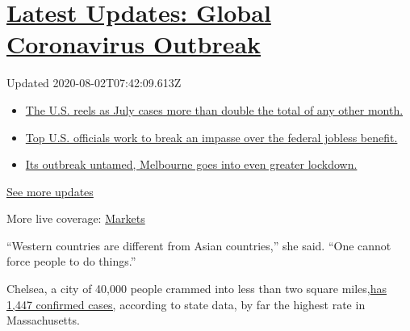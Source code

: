 \hypertarget{latest-updates-global-coronavirus-outbreak}{%
\section{\texorpdfstring{\href{https://www.nytimes.com/2020/08/01/world/coronavirus-covid-19.html?action=click\&pgtype=Article\&state=default\&region=MAIN_CONTENT_1\&context=storylines_live_updates}{Latest
Updates: Global Coronavirus
Outbreak}}{Latest Updates: Global Coronavirus Outbreak}}\label{latest-updates-global-coronavirus-outbreak}}

Updated 2020-08-02T07:42:09.613Z

\begin{itemize}
\tightlist
\item
  \href{https://www.nytimes.com/2020/08/01/world/coronavirus-covid-19.html?action=click\&pgtype=Article\&state=default\&region=MAIN_CONTENT_1\&context=storylines_live_updates\#link-34047410}{The
  U.S. reels as July cases more than double the total of any other
  month.}
\item
  \href{https://www.nytimes.com/2020/08/01/world/coronavirus-covid-19.html?action=click\&pgtype=Article\&state=default\&region=MAIN_CONTENT_1\&context=storylines_live_updates\#link-780ec966}{Top
  U.S. officials work to break an impasse over the federal jobless
  benefit.}
\item
  \href{https://www.nytimes.com/2020/08/01/world/coronavirus-covid-19.html?action=click\&pgtype=Article\&state=default\&region=MAIN_CONTENT_1\&context=storylines_live_updates\#link-2bc8948}{Its
  outbreak untamed, Melbourne goes into even greater lockdown.}
\end{itemize}

\href{https://www.nytimes.com/2020/08/01/world/coronavirus-covid-19.html?action=click\&pgtype=Article\&state=default\&region=MAIN_CONTENT_1\&context=storylines_live_updates}{See
more updates}

More live coverage:
\href{https://www.nytimes.com/live/2020/07/31/business/stock-market-today-coronavirus?action=click\&pgtype=Article\&state=default\&region=MAIN_CONTENT_1\&context=storylines_live_updates}{Markets}

``Western countries are different from Asian countries,'' she said.
``One cannot force people to do things.''

Chelsea, a city of 40,000 people crammed into less than two square
miles,\href{https://www.mass.gov/doc/confirmed-covid-19-cases-in-ma-by-citytown-january-1-2020-april-22-2020-pdf/download}{has
1,447 confirmed cases,} according to state data, by far the highest rate
in Massachusetts.

